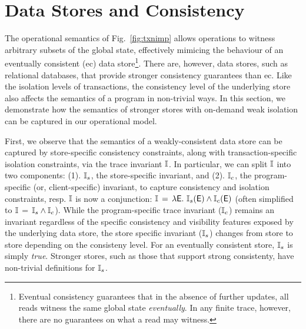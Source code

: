 \section{Data Stores and Consistency}
\label{sec:store-consistency}

The operational semantics of Fig.~\ref{fig:txnimp} allows operations
to witness arbitrary subsets of the global state, effectively mimicing the
behaviour of an eventually consistent ({\sc ec}) data
store\footnote{Eventual consistency guarantees that in the absence of further
  updates, all reads witness the same global state
  \emph{eventually}. In any finite trace, however, there are no
  guarantees on what a read may witness.}. There are, however, data stores,
such as relational databases, that provide stronger consistency
guarantees than {\sc ec}. Like the isolation levels of transactions,
the consistency level of the underlying store also affects the
semantics of a program in non-trivial ways. In this section, we
demonstrate how the semantics of stronger stores with on-demand weak
isolation can be captured in our operational model. 


First, we observe that the semantics of a weakly-consistent data store
can be captured by store-specific consistency constraints, along with
transaction-specific isolation constraints, via the trace invariant
$\mathbb{I}$. In particular, we can split $\mathbb{I}$ into two components: (1).
$\mathbb{I}_s$, the store-specific invariant, and (2). $\mathbb{I}_c$, the
program-specific (or, client-specific) invariant, to capture
consistency and isolation constraints, resp.  $\mathbb{I}$ is now a
conjunction: $\mathbb{I} \,=\, \lambda\textsf{E}.~\mathbb{I}_s(\textsf{E}) \wedge \mathbb{I}_c(\textsf{E})$ (often
simplified to $\mathbb{I} \,=\, \mathbb{I}_s\wedge\mathbb{I}_c$).  While the program-specific
trace invariant ($\mathbb{I}_c$) remains an invariant regardless of the
specific consistency and visibility features exposed by the underlying
data store, the store specific invariant ($\mathbb{I}_s$) changes from store
to store depending on the consisteny level.  For an eventually
consistent store, $\mathbb{I}_s$ is simply \emph{true}. Stronger stores, such
as those that support strong consistenty, have non-trivial definitions
for $\mathbb{I}_s$.


